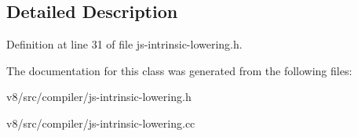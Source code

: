 \subsection{Detailed Description}


Definition at line 31 of file js-\/intrinsic-\/lowering.\+h.



The documentation for this class was generated from the following files\+:\begin{DoxyCompactItemize}
\item 
v8/src/compiler/js-\/intrinsic-\/lowering.\+h\item 
v8/src/compiler/js-\/intrinsic-\/lowering.\+cc\end{DoxyCompactItemize}

